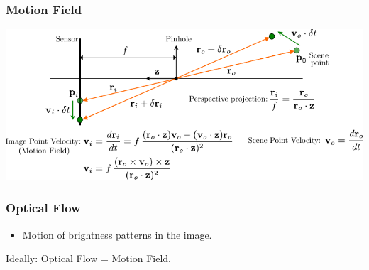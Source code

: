 \begin{frame}
  \frametitle{Motion Field}
  \begin{center}
    \includegraphics[width=\columnwidth]{./images/optical_flow/motion_field.pdf}
  \end{center}

\end{frame}


\begin{frame}
  \frametitle{Optical Flow}

  \begin{itemize}
    \item Motion of brightness patterns in the image.
  \end{itemize}

  \begin{center}


    Ideally: Optical Flow = Motion Field.
  \end{center}

\end{frame}

